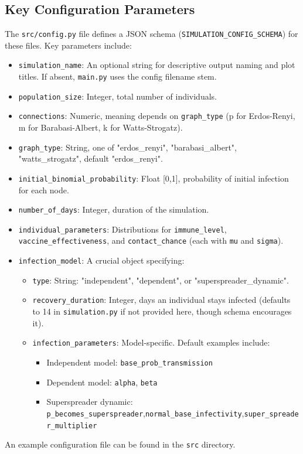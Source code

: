 \documentclass[12pt]{article}
\begin{document}
\subsection{Key Configuration Parameters}
The \texttt{src/config.py} file defines a JSON schema (\texttt{SIMULATION\_CONFIG\_SCHEMA}) for these files. Key parameters include:
\begin{itemize}
    \item \texttt{simulation\_name}: An optional string for descriptive output naming and plot titles. If absent, \texttt{main.py} uses the config filename stem.
    \item \texttt{population\_size}: Integer, total number of individuals.
    \item \texttt{connections}: Numeric, meaning depends on \texttt{graph\_type} (p for Erdos-Renyi, m for Barabasi-Albert, k for Watts-Strogatz).
    \item \texttt{graph\_type}: String, one of "erdos\_renyi", "barabasi\_albert", "watts\_strogatz", default "erdos\_renyi".
    \item \texttt{initial\_binomial\_probability}: Float [0,1], probability of initial infection for each node.
    \item \texttt{number\_of\_days}: Integer, duration of the simulation.
    \item \texttt{individual\_parameters}: Distributions for \texttt{immune\_level}, \texttt{vaccine\_ef\-fec\-tive\-ness}, and \texttt{contact\_chance} (each with \texttt{mu} and \texttt{sigma}).
    \item \texttt{infection\_model}: A crucial object specifying:
    \begin{itemize}
      \item \texttt{type}: String: "independent", "dependent", or "super\-spreader\_dy\-namic".
      \item \texttt{recovery\_duration}: Integer, days an individual stays infected (defaults to 14 in \texttt{simulation.py} if not provided here, though schema encourages it).
      \item \texttt{infection\_parameters}: Model-specific. Default examples include:
          \begin{itemize}
              \item Independent model: \texttt{base\_prob\_trans\-mis\-sion}
              \item Dependent model: \texttt{alpha}, \texttt{beta}
              \item Superspreader dynamic: \texttt{p\_becomes\_super\-spread\-er},\allowbreak \texttt{normal\_base\_in\-fec\-tiv\-ity},\allowbreak \texttt{super\_spread\-er\_multi\-pli\-er}
          \end{itemize}
    \end{itemize}
  \end{itemize}
An example configuration file can be found in the \texttt{src} directory.
\end{document}
